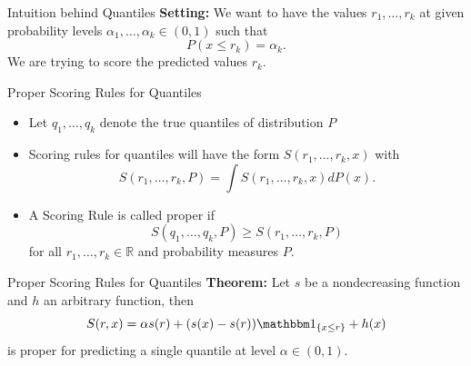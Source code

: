 \documentclass[aspectratio=43,10pt]{beamer}
\begin{document}
\begin{frame}{Intuition behind Quantiles}
\textbf{Setting:} We want to have the values $r_1,\dots,r_k$ at given probability levels $\alpha_1,\dots,\alpha_k\in (0,1)$ such that \begin{equation*}
    P(x\leq r_k)=\alpha_k.
\end{equation*}
We are trying to score the predicted values $r_k$.
\end{frame}

\begin{frame}{Proper Scoring Rules for Quantiles}
\begin{itemize}
    \item Let $q_1,\dots,q_k$ denote the true quantiles of distribution $P$
    \item Scoring rules for quantiles will have the form $S(r_1,\dots,r_k,x)$ with \begin{equation*}
        S(r_1,\dots,r_k,P)=\int S(r_1,\dots,r_k,x)dP(x).
    \end{equation*}
    \item A Scoring Rule is called proper if \begin{equation*}
        S(q_1,\dots,q_k,P)\geq S(r_1,\dots,r_k,P)
    \end{equation*}
    for all $r_1,\dots,r_k\in\mathbb R$ and probability measures $P$.
\end{itemize}
\end{frame}
\begin{frame}{Proper Scoring Rules for Quantiles}
\textbf{Theorem:} Let $s$ be a nondecreasing function and $h$ an arbitrary function, then \begin{equation*}
    S(r,x)=\alpha s(r)+(s(x)-s(r))\mathbbm 1_{\{x\leq r\}} +h(x)
\end{equation*}
is proper for predicting a single quantile at level $\alpha\in (0,1)$.
    
\end{frame}
\end{document}
